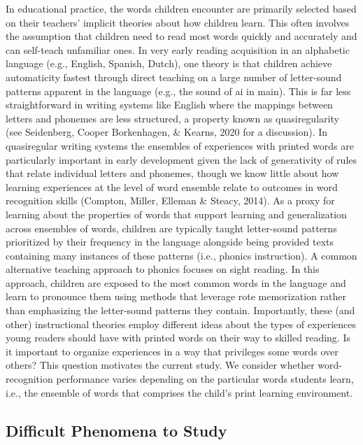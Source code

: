 \documentclass[
  ,man,floatsintext]{apa6}
\begin{document}
In educational practice, the words children encounter are primarily selected based on their teachers' implicit theories about how children learn. This often involves the assumption that children need to read most words quickly and accurately and can self-teach unfamiliar ones. In very early reading acquisition in an alphabetic language (e.g., English, Spanish, Dutch), one theory is that children achieve automaticity fastest through direct teaching on a large number of letter-sound patterns apparent in the language (e.g., the sound of ai in main). This is far less straightforward in writing systems like English where the mappings between letters and phonemes are less structured, a property known as quasiregularity (see Seidenberg, Cooper Borkenhagen, \& Kearns, 2020 for a discussion). In quasiregular writing systems the ensembles of experiences with printed words are particularly important in early development given the lack of generativity of rules that relate individual letters and phonemes, though we know little about how learning experiences at the level of word ensemble relate to outcomes in word recognition skills (Compton, Miller, Elleman \& Steacy, 2014).
As a proxy for learning about the properties of words that support learning and generalization across ensembles of words, children are typically taught letter-sound patterns prioritized by their frequency in the language alongside being provided texts containing many instances of these patterns (i.e., phonics instruction). A common alternative teaching approach to phonics focuses on sight reading. In this approach, children are exposed to the most common words in the language and learn to pronounce them using methods that leverage rote memorization rather than emphasizing the letter-sound patterns they contain.
Importantly, these (and other) instructional theories employ different ideas about the types of experiences young readers should have with printed words on their way to skilled reading. Is it important to organize experiences in a way that privileges some words over others? This question motivates the current study. We consider whether word-recognition performance varies depending on the particular words students learn, i.e., the ensemble of words that comprises the child's print learning environment.

\subsection{Difficult Phenomena to Study}\label{difficult-phenomena-to-study}
\end{document}

